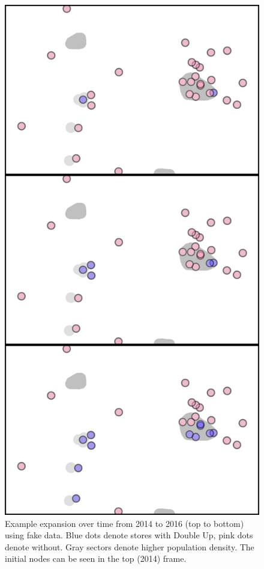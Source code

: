 \documentclass[12pt,letterpaperpaper,]{book}
\begin{document}
\begin{figure}

{\centering \includegraphics{figures/expansion-v} 

}

\caption{Example expansion over time from 2014 to 2016 (top to bottom) using fake data. Blue dots denote stores with Double Up, pink dots denote without. Gray sectors denote higher population density. The initial nodes can be seen in the top (2014) frame.}\label{fig:dufb-expansion}
\end{figure}
\end{document}
